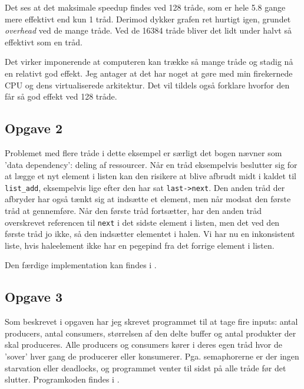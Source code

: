 \documentclass{article}
\begin{document}
Det ses at det maksimale speedup findes ved 128 tråde, som er hele 5.8 gange mere effektivt end kun 1 tråd. Derimod dykker grafen ret hurtigt igen, grundet \textit{overhead} ved de mange tråde. Ved de 16384 tråde bliver det lidt under halvt så effektivt som en tråd. 

Det virker imponerende at computeren kan trække så mange tråde og stadig nå en relativt god effekt. Jeg antager at det har noget at gøre med min firekernede CPU og dens virtualiserede arkitektur. Det vil tildels også forklare hvorfor den får så god effekt ved 128 tråde.

\subsection*{Opgave 2}
Problemet med flere tråde i dette eksempel er særligt det bogen nævner som 'data dependency': deling af ressourcer. Når en tråd eksempelvis beslutter sig for at lægge et nyt element i listen kan den risikere at blive afbrudt midt i kaldet til \texttt{list\_add}, eksempelvis lige efter den har sat \texttt{last->next}. Den anden tråd der afbryder har også tænkt sig at indsætte et element, men når modsat den første tråd at gennemføre. Når den første tråd fortsætter, har den anden tråd overskrevet referencen til \texttt{next} i det sidste element i listen, men det ved den første tråd jo ikke, så den indsætter elementet i halen. Vi har nu en inkonsistent liste, hvis haleelement ikke har en pegepind fra det forrige element i listen.

Den færdige implementation kan findes i .

\subsection*{Opgave 3}
Som beskrevet i opgaven har jeg skrevet programmet til at tage fire inputs: antal producers, antal consumers, størrelsen af den delte buffer og antal produkter der skal produceres. Alle producers og consumers kører i deres egen tråd hvor de 'sover' hver gang de producerer eller konsumerer. Pga. semaphorerne er der ingen starvation eller deadlocks, og programmet venter til sidst på alle tråde før det slutter. Programkoden findes i .
\end{document}
